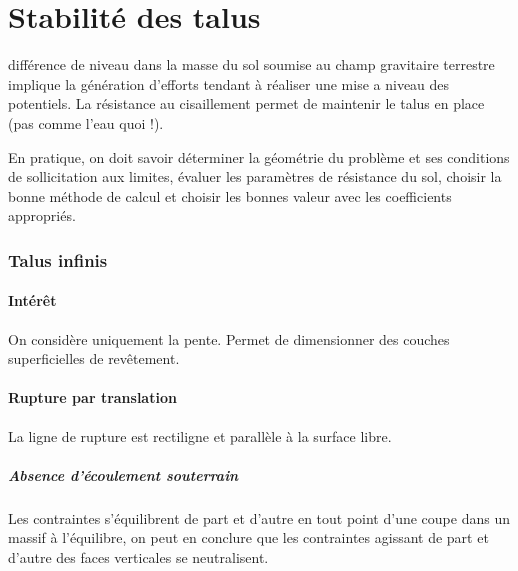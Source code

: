 \part{Stabilité des talus}

différence de niveau dans la masse du sol soumise au champ gravitaire terrestre implique la génération d'efforts tendant à réaliser une mise a niveau des potentiels. La résistance au cisaillement permet de maintenir le talus en place (pas comme l'eau quoi !).

En pratique, on doit savoir déterminer la géométrie du problème et ses conditions de sollicitation aux limites, évaluer les paramètres de résistance du sol, choisir la bonne méthode de calcul et choisir les bonnes valeur avec les coefficients appropriés.

\section{Talus infinis}

\subsection{Intérêt}

On considère uniquement la pente. Permet de dimensionner des couches superficielles de revêtement.

\subsection{Rupture par translation}

La ligne de rupture est rectiligne et parallèle à la surface libre.

\subsubsection{Absence d'écoulement souterrain}

Les contraintes s'équilibrent de part et d'autre en tout point d'une coupe dans un massif à l'équilibre, on peut en conclure que les contraintes agissant de part et d'autre des faces verticales se neutralisent.

